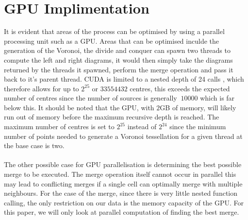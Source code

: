 \section{GPU Implimentation}
It is evident that areas of the process can be optimised by using a parallel processing unit such as a GPU. Areas that can be optimised inculde the generation of the Voronoi, the divide and conquer can spawn two threads to compute the left and right diagrams, it would then simply take the diagrams returned by the threads it spawned, perform the merge operation and pass it back to it's parent thread. CUDA is limited to a nested depth of 24 calls \citep{CUDA}, which therefore allows for up to $2^{25}$ or $33554432$ centres, this exceeds the expected number of centres since the number of sources is generally $~10000$ which is far below this. It should be noted that the GPU, with $2$GB of memory, will likely run out of memory before the maximum recursive depth is reached. The maximum number of centres is set to $2^{25}$ instead of $2^{24}$ since the minimum number of points needed to generate a Voronoi tessellation for a given thread at the base case is two.
\\
\\
The other possible case for GPU parallelisation is determining the best possible merge to be executed. The merge operation itself cannot occur in parallel this may lead to conflicting merges if a single cell can optimally merge with multiple neighbours. For the case of the merge, since there is very little nested function calling, the only restriction on our data is the memory capacity of the GPU. For this paper, we will only look at parallel computation of finding the best merge.